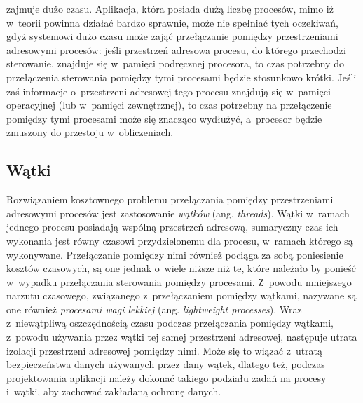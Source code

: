 \documentclass[12pt]{mwart}
\begin{document}
	zajmuje dużo czasu. Aplikacja, która posiada dużą liczbę procesów, mimo iż w~teorii powinna działać bardzo sprawnie,
	może nie spełniać tych oczekiwań, gdyż systemowi dużo czasu może zająć przełączanie pomiędzy przestrzeniami adresowymi procesów:
	jeśli przestrzeń adresowa procesu, do którego przechodzi sterowanie, znajduje się w~pamięci podręcznej procesora, to czas potrzebny do 
	przełączenia sterowania pomiędzy tymi procesami będzie stosunkowo krótki. Jeśli zaś informacje o~przestrzeni adresowej tego procesu znajdują się
	w~pamięci operacyjnej (lub w~pamięci zewnętrznej), to czas potrzebny na przełączenie pomiędzy tymi procesami może się znacząco wydłużyć,
	a~procesor będzie zmuszony do przestoju w~obliczeniach.
\par
%
\subsection{Wątki}
\indent
	Rozwiązaniem kosztownego problemu przełączania pomiędzy przestrzeniami adresowymi procesów jest zastosowanie \emph{wątków} (ang. \emph{threads}).
	Wątki w~ramach jednego procesu posiadają wspólną przestrzeń adresową, sumaryczny czas ich wykonania jest równy czasowi przydzielonemu dla 
	procesu, w~ramach którego są wykonywane. Przełączanie pomiędzy nimi również pociąga za sobą poniesienie kosztów czasowych, są one jednak
	o~wiele niższe niż te, które należało by ponieść w~wypadku przełączania sterowania pomiędzy procesami. Z~powodu mniejszego narzutu czasowego,
	związanego z~przełączaniem pomiędzy wątkami, nazywane są one również \emph{procesami wagi lekkiej} (ang. \emph{lightweight processes}).
	Wraz z~niewątpliwą oszczędnością czasu podczas przełączania pomiędzy wątkami, z~powodu używania przez wątki tej samej przestrzeni adresowej,
	następuje utrata izolacji przestrzeni adresowej pomiędzy nimi. Może się to wiązać z~utratą bezpieczeństwa danych używanych przez dany wątek,
	dlatego też, podczas projektowania aplikacji należy dokonać takiego podziału zadań na procesy i~wątki, aby zachować zakładaną ochronę danych.
\par
%
\end{document}

